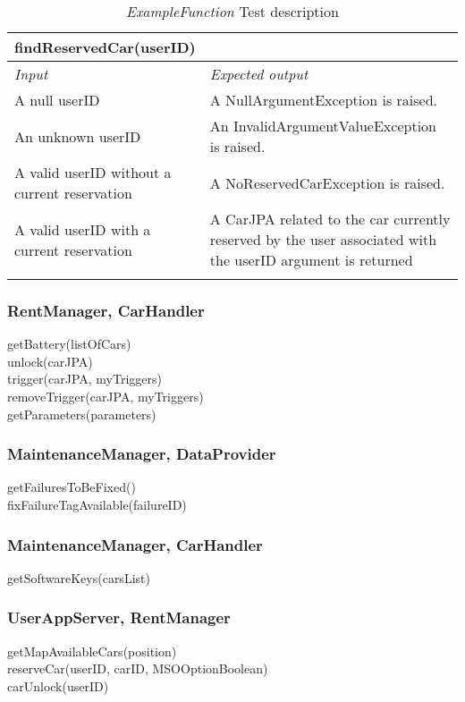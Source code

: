 \begin{longtable}{p{0.3\linewidth}p{0.7\linewidth}}
\hline \textbf{findReservedCar(userID)} \\
\toprule
\emph{Input} & \emph{Expected output} \\
\midrule
A null userID & A NullArgumentException is raised.\\
\midrule
An unknown userID  & An InvalidArgumentValueException is
raised. \\
\midrule
A valid userID without a current reservation & A NoReservedCarException is
raised. \\
\midrule
A valid userID with a current reservation & A CarJPA related to the car currently reserved by the user associated with the userID argument is returned \\
\bottomrule
\caption{\emph{ExampleFunction} Test description}
\end{longtable}

\subsubsection{RentManager, CarHandler}
getBattery(listOfCars) \\
unlock(carJPA) \\
trigger(carJPA, myTriggers) \\
removeTrigger(carJPA, myTriggers) \\
getParameters(parameters) \\ %

\subsubsection{MaintenanceManager, DataProvider}
getFailuresToBeFixed()\\
fixFailureTagAvailable(failureID)

\subsubsection{MaintenanceManager, CarHandler}
getSoftwareKeys(carsList) 

\subsubsection{UserAppServer, RentManager}
getMapAvailableCars(position) \\
reserveCar(userID, carID, MSOOptionBoolean) \\
carUnlock(userID) \\

